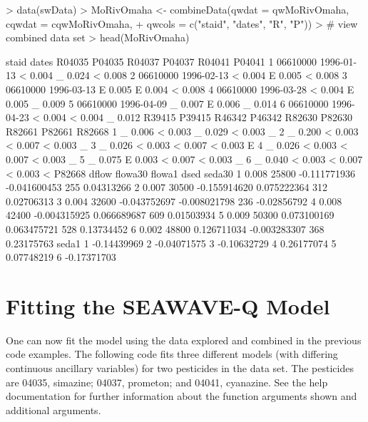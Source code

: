\documentclass[11pt]{article}
\begin{document}
\begin{Schunk}
\begin{Sinput}
> data(swData)
> MoRivOmaha <- combineData(qwdat = qwMoRivOmaha, cqwdat = cqwMoRivOmaha,
+ qwcols = c("staid", "dates", "R", "P"))
> # view combined data set
> head(MoRivOmaha)
\end{Sinput}
\begin{Soutput}
     staid      dates R04035 P04035 R04037 P04037 R04041 P04041
1 06610000 1996-01-13      <  0.004      _  0.024      <  0.008
2 06610000 1996-02-13      <  0.004      E  0.005      <  0.008
3 06610000 1996-03-13      E  0.005      E  0.004      <  0.008
4 06610000 1996-03-28      <  0.004      E  0.005      _  0.009
5 06610000 1996-04-09      _  0.007      E  0.006      _  0.014
6 06610000 1996-04-23      <  0.004      <  0.004      _  0.012
  R39415 P39415 R46342 P46342 R82630 P82630 R82661 P82661 R82668
1      _  0.006      <  0.003      _  0.029      <  0.003      _
2      _  0.200      <  0.003      <  0.007      <  0.003      _
3      _  0.026      <  0.003      <  0.007      <  0.003      E
4      _  0.026      <  0.003      <  0.007      <  0.003      _
5      _  0.075      E  0.003      <  0.007      <  0.003      _
6      _  0.040      <  0.003      <  0.007      <  0.003      <
  P82668 dflow      flowa30       flowa1 dsed      seda30
1  0.008 25800 -0.111771936 -0.041600453  255  0.04313266
2  0.007 30500 -0.155914620  0.075222364  312  0.02706313
3  0.004 32600 -0.043752697 -0.008021798  236 -0.02856792
4  0.008 42400 -0.004315925  0.066689687  609  0.01503934
5  0.009 50300  0.073100169  0.063475721  528  0.13734452
6  0.002 48800  0.126711034 -0.003283307  368  0.23175763
        seda1
1 -0.14439969
2 -0.04071575
3 -0.10632729
4  0.26177074
5  0.07748219
6 -0.17371703
\end{Soutput}
\end{Schunk}

\section{Fitting the SEAWAVE-Q Model}

One can now fit the model using the data explored and combined in the previous code examples. The following code fits three different  models (with differing continuous ancillary variables) for two pesticides in the data set.  The pesticides are 04035, simazine; 04037, prometon; and 04041, cyanazine.  See the help documentation for further information about the function arguments shown and additional arguments.
\vspace{5 mm}
\end{document}
